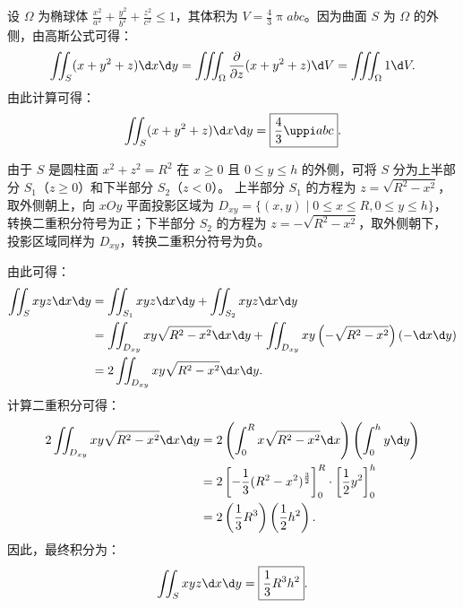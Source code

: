 \begin{solution}

    设 $\Omega$ 为椭球体 $\frac{x^2}{a^2} + \frac{y^2}{b^2} + \frac{z^2}{c^2} \le 1$，其体积为 $V = \frac{4}{3} \uppi a b c$。因为曲面 $S$ 为 $\Omega$ 的外侧，由高斯公式可得：
    \begin{equation}
        \label{eq:ellipsoid-1}
        \iint_{S} (x + y^2 + z) \d x \d y = \iiint_{\Omega} \frac{\partial}{\partial z} (x + y^2 + z) \d V = \iiint_{\Omega} 1 \d V.
    \end{equation}
    由此计算可得：
    \begin{equation}
        \label{eq:ellipsoid-2}
        \iint_{S} (x + y^2 + z) \d x \d y = \boxed{\frac{4}{3} \uppi a b c}.
    \end{equation}


    由于 $S$ 是圆柱面 $x^2 + z^2 = R^2$ 在 $x \ge 0$ 且 $0 \le y \le h$ 的外侧，可将 $S$ 分为上半部分 $S_1$（$z \ge 0$）和下半部分 $S_2$（$z < 0$）。
    上半部分 $S_1$ 的方程为 $z = \sqrt{R^2 - x^2}$，取外侧朝上，向 $xOy$ 平面投影区域为 $D_{xy} = \{ (x,y) \mid 0 \le x \le R, 0 \le y \le h \}$，转换二重积分符号为正；下半部分 $S_2$ 的方程为 $z = -\sqrt{R^2 - x^2}$，取外侧朝下，投影区域同样为 $D_{xy}$，转换二重积分符号为负。

    由此可得：
    \begin{equation}
        \label{eq:cylinder-1}
        \begin{aligned}
            \iint_{S} x y z \d x \d y & = \iint_{S_1} x y z \d x \d y + \iint_{S_2} x y z \d x \d y                                                         \\
                                      & = \iint_{D_{xy}} x y \sqrt{R^2 - x^2} \d x \d y + \iint_{D_{xy}} x y \left( -\sqrt{R^2 - x^2} \right) (- \d x \d y) \\
                                      & = 2 \iint_{D_{xy}} x y \sqrt{R^2 - x^2} \d x \d y.
        \end{aligned}
    \end{equation}
    计算二重积分可得：
    \begin{equation}
        \label{eq:cylinder-2}
        \begin{aligned}
            2 \iint_{D_{xy}} x y \sqrt{R^2 - x^2} \d x \d y & = 2 \left( \int_0^R x \sqrt{R^2 - x^2} \d x \right) \left( \int_0^h y \d y \right)                     \\
                                                            & = 2 \left[ -\frac{1}{3} (R^2 - x^2)^{\frac{3}{2}} \right]_0^R \cdot \left[ \frac{1}{2} y^2 \right]_0^h \\
                                                            & = 2 \left( \frac{1}{3} R^3 \right) \left( \frac{1}{2} h^2 \right).
        \end{aligned}
    \end{equation}
    因此，最终积分为：
    \begin{equation}
        \label{eq:cylinder-3}
        \iint_{S} x y z \d x \d y = \boxed{\frac{1}{3} R^3 h^2}.
    \end{equation}


\end{solution}
